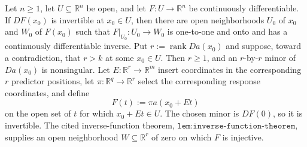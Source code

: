 Let \(n\geq 1\), let \(U\subseteq\mathbb R^n\) be open, and let \(F:U\to\mathbb R^n\) be continuously differentiable.  If \(DF(x_0)\) is invertible at \(x_0\in U\), then there are open neighborhoods \(U_0\) of \(x_0\) and \(W_0\) of \(F(x_0)\) such that \(F|_{U_0}:U_0\to W_0\) is one-to-one and onto and has a continuously differentiable inverse.
Put \(r:=\operatorname{rank}Da(x_0)\) and suppose, toward a contradiction, that \(r>k\) at some \(x_0\in U\).  Then \(r\geq1\), and an \(r\)-by-\(r\) minor of \(Da(x_0)\) is nonsingular.  Let \(E:\mathbb R^r\to\mathbb R^m\) insert coordinates in the corresponding \(r\) predictor positions, let \(\pi:\mathbb R^q\to\mathbb R^r\) select the corresponding response coordinates, and define
\[
 F(t):=\pi a(x_0+Et)
\]
on the open set of \(t\) for which \(x_0+Et\in U\).  The chosen minor is \(DF(0)\), so it is invertible.  The cited inverse-function theorem, \(\texttt{lem:inverse-function-theorem}\), supplies an open neighborhood \(W\subseteq\mathbb R^r\) of zero on which \(F\) is injective.


